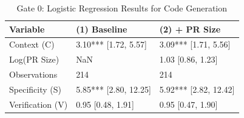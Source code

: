 \begin{table}
\caption{Gate 0: Logistic Regression Results for Code Generation}
\label{tab:gate0}
\begin{tabular}{lll}
\toprule
Variable & (1) Baseline & (2) + PR Size \\
\midrule
Context (C) & 3.10*** [1.72, 5.57] & 3.09*** [1.71, 5.56] \\
Log(PR Size) & NaN & 1.03 [0.86, 1.23] \\
Observations & 214 & 214 \\
Specificity (S) & 5.85*** [2.80, 12.25] & 5.92*** [2.82, 12.42] \\
Verification (V) & 0.95 [0.48, 1.91] & 0.95 [0.47, 1.90] \\
\bottomrule
\end{tabular}
\end{table}
